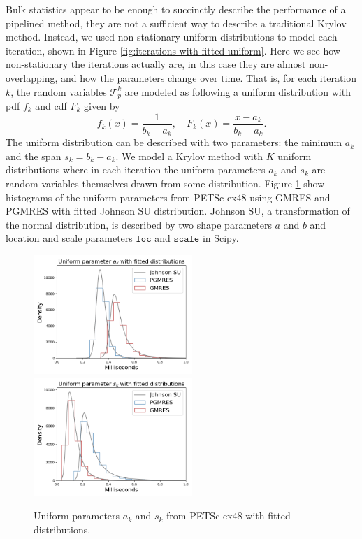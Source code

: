 \documentclass[sigconf]{acmart}
\begin{document}
Bulk statistics appear to be enough to succinctly describe the performance of a pipelined method, they are not a sufficient way to describe a traditional Krylov method. Instead, we used non-stationary uniform distributions to model each iteration, shown in Figure \ref{fig:iterations-with-fitted-uniform}.
Here we see how non-stationary the iterations actually are, in this case they are almost non-overlapping, and how the parameters change over time. 
That is, for each iteration $k$, the random variables $\mathcal{T}_p^k$ are modeled as following a uniform distribution with pdf $f_k$ and cdf $F_k$ given by
\begin{equation} \label{eq:uniform}
f_k(x) = \frac{1}{b_k - a_k}, \quad F_k(x) = \frac{x-a_k}{b_k-a_k}.
\end{equation}
The uniform distribution can be described with two parameters: the minimum $a_k$ and the span $s_k = b_k - a_k$. We model a Krylov method with $K$ uniform distributions
where in each iteration the uniform parameters $a_k$ and $s_k$ are random variables themselves drawn from some distribution. 
Figure \ref{fig:uniform-params-fitted} show histograms of the uniform parameters from  PETSc ex48 using GMRES and PGMRES with fitted Johnson SU distribution.
Johnson SU, a transformation of the normal distribution, is described by two shape parameters $a$ and $b$ and location and scale parameters ${\texttt{loc}}$ and ${\texttt{scale}}$ in Scipy.  

\begin{figure}[t]
\centering
\includegraphics[width=6cm]{../plots/GMRES_PGMRES_ex48_8192_1000000_uniform_a_k_with_johnsonsu.png}
\includegraphics[width=6cm]{../plots/GMRES_PGMRES_ex48_8192_1000000_uniform_s_k_with_johnsonsu.png} 
\caption{Uniform parameters $a_k$ and $s_k$ from PETSc ex48 with fitted distributions.} \label{fig:uniform-params-fitted}
\end{figure}
\end{document}
